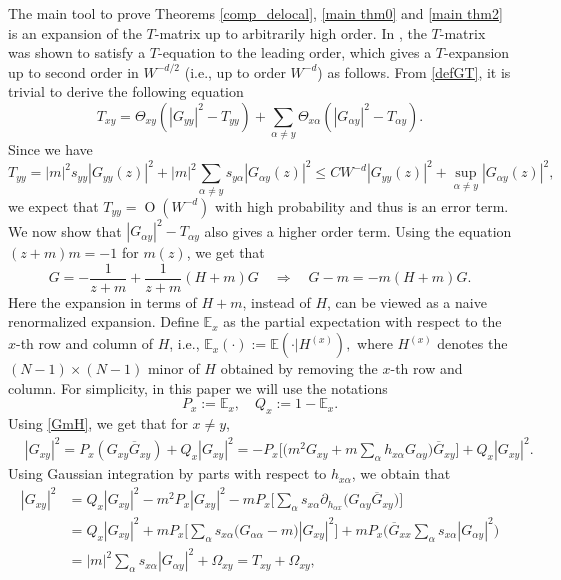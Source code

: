 \documentclass{article}
\newcommand{\1}{\mathds{1}}
\numberwithin{equation}{section}
\newcommand{\al}{\alpha}
\newcommand{\be}{\begin{equation}}
\newcommand{\ee}{\end{equation}}
\renewcommand{\leq}{\leqslant}
\renewcommand{\le}{\leq}
\newcommand{\E}{\mathbb{E}}
\newcommand{\renormal}{\text{self-energy renormalization}}
\DeclareMathOperator{\OO}{O}
\theoremstyle{plain} %
\theoremstyle{remark}
\begin{document}
The main tool to prove Theorems \ref{comp_delocal}, \ref{main thm0} and \ref{main thm2} is an expansion of the $T$-matrix %
up to arbitrarily high order. In \cite{delocal}, the $T$-matrix was shown to satisfy a $T$-equation to the leading order, which gives a $T$-expansion up to second order in $W^{-d/2}$ (i.e., up to order $W^{-d}$) as follows. %
From \eqref{defGT}, it is trivial to derive the following equation 
\be\label{T-equation}
T _{xy}=\Theta_{xy} ( |G_{y y}|^2- T_{yy})+\sum_{\al\ne y}\Theta_{x\al} (|G_{\al y}|^2- T_{\al y}) .
\ee
Since we have  
\[
T_{y y} =  |m|^2 s_{y y}|G_{y y}(z)|^2+ |m|^2 \sum_{\al \ne y} s_{y \al}|G_{\al y}(z)|^2 \le CW^{-d}|G_{y y}(z)|^2 + \sup_{\al\ne y} |G_{\al y}(z)|^2, 
\]
we expect that $T_{y y}=\OO(W^{-d})$ with high probability and thus is an error term. We now show that $|G_{\al y}|^2- T_{\al y}$ also gives a higher order term. Using the equation $(z+ m) m = -1$ for $m(z)$, we get that
\be\label{GmH}
G = - \frac 1 { z+m} + \frac 1 { z+m} (H+m) G \quad \Rightarrow \quad G-   m = - m  (H+m) G .
\ee
Here the expansion in terms of $H+m$, instead of $H$, can be viewed as a naive renormalized expansion.  
 Define $\E_x$ as the partial expectation with respect to the $x$-th row and column of $H$, i.e., $\E_x(\cdot) := \E(\cdot|H^{(x)}),$	where $H^{(x)}$ denotes the $(N-1)\times(N-1)$ minor of $H$ obtained by removing the $x$-th row and column. %
For simplicity, in this paper we will use the notations 
$$P_x :=\E_x , \quad Q_x := 1-\E_x.$$
Using \eqref{GmH}, we get that for $x\ne y$,
\begin{align*}
	&  |G_{xy}|^2 =P_x \left( G_{xy}  \overline G_{xy}  \right) + Q_x  |G_{xy}|^2  
	=  - P_x \Big[ \Big(m^2 G_{xy} + m \sum_\al h_{x\al }G_{\al y}\Big)  \overline G_{xy}\Big] + Q_x |G_{xy}|^2   .
\end{align*}
Using Gaussian integration by parts with respect to $h_{x\al }$, we obtain that
\begin{align}
	|G_{xy}|^2 %
	&= Q_x    |G_{xy}|^2 - m^2 P_x | G_{xy} |^2  - m P_x \Big[  \sum_\al s_{x\al } \partial_{ h_{ \al x }} \big ( 
	G_{\al y}  \overline G_{xy}  \big )\Big] \nonumber\\
	& =  Q_x   |G_{xy}|^2+ m P_x   \Big[\sum_\al s_{x\al }\big ( G_{\al \al}- m \big ) |G_{xy}|^2 \Big] +  m P_x\Big(  \overline G_{xx}   \sum_\al s_{x\al }|G_{\al y}|^2  \Big)  \nonumber \\
	& =   |m|^2   \sum_\al s_{x\al } |G_{\al y}|^2 + \Omega_{xy} = T_{xy} + \Omega_{xy},\label{G-T}
\end{align}
\end{document}
